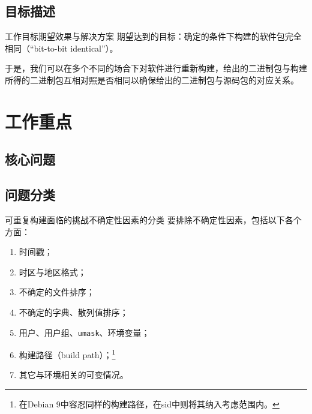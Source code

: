\documentclass{beamer}
\begin{document}
\subsection{目标描述}
\begin{frame}{工作目标}{期望效果与解决方案}
期望达到的目标：确定的条件下构建的软件包完全相同（“bit-to-bit identical”）。

\begin{figure}[htbp]
\end{figure}

于是，我们可以在多个不同的场合下对软件进行重新构建，给出的二进制包与构建所得的二进制包互相对照是否相同以确保给出的二进制包与源码包的对应关系。
\end{frame}
\section{工作重点}
\subsection{核心问题}
\subsection{问题分类}
\begin{frame}{可重复构建面临的挑战}{不确定性因素的分类}
要排除不确定性因素，包括以下各个方面：

\vspace{1em}
\begin{enumerate}
\item 时间戳；
\item 时区与地区格式；
\item 不确定的文件排序；
\item 不确定的字典、散列值排序；
\item 用户、用户组、\texttt{umask}、环境变量；
\item 构建路径（build path）；\footnote{在Debian 9中容忍同样的构建路径，在sid中则将其纳入考虑范围内。\vspace{1em}}
\item 其它与环境相关的可变情况。
\end{enumerate}
\end{frame}
\end{document}
